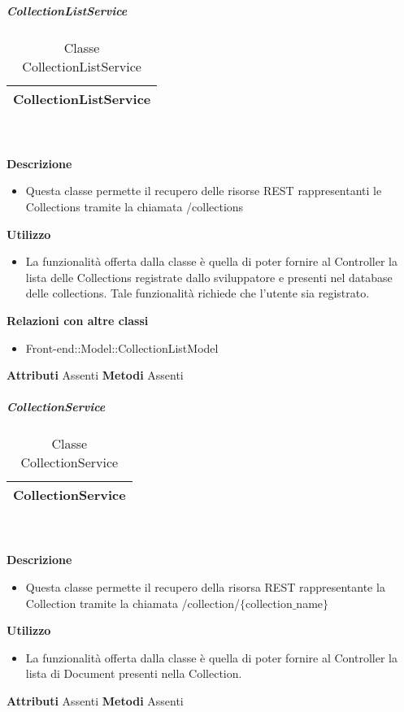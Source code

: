 			\subparagraph{CollectionListService} 
\begin{table}[ht]
\begin{center}
\bgroup
	\setlength{\arrayrulewidth}{0.6mm}
	\def\arraystretch{1}
		\begin{tabular}{ | p{12cm} | }
				\hline  
					\centerline{\textbf{CollectionListService}}
		\\ \hline 
				\hline
				\hline
		
		\end{tabular}
\egroup
\caption{Classe CollectionListService}
\end{center}
\end{table} \textbf{\\ \\ Descrizione}
\begin{itemize}
\item[] Questa classe permette il recupero delle risorse REST rappresentanti le Collections tramite la chiamata /collections
\end{itemize} 
\textbf{Utilizzo}
\begin{itemize}
\item[] La funzionalità offerta dalla classe è quella di poter fornire al Controller la lista delle Collections registrate dallo sviluppatore e presenti nel database delle collections.
Tale funzionalità richiede che l'utente sia registrato.
\end{itemize}
\textbf{Relazioni con altre classi}
\begin{itemize}
\item{Front-end::Model::CollectionListModel}
\end{itemize}
\textbf{Attributi}
Assenti
\textbf{Metodi}
Assenti

			\subparagraph{CollectionService} 
\begin{table}[ht]
\begin{center}
\bgroup
	\setlength{\arrayrulewidth}{0.6mm}
	\def\arraystretch{1}
		\begin{tabular}{ | p{12cm} | }
				\hline  
					\centerline{\textbf{CollectionService}}
		\\ \hline 
				\hline
				\hline
		
		\end{tabular}
\egroup
\caption{Classe CollectionService}
\end{center}
\end{table} \textbf{\\ \\ Descrizione}
\begin{itemize}
\item[] Questa classe permette il recupero della risorsa REST rappresentante la Collection tramite la chiamata  /collection/$\{$collection$\_$name$\}$
\end{itemize} 
\textbf{Utilizzo}
\begin{itemize}
\item[] La  funzionalità offerta dalla classe è quella di poter fornire al Controller la lista di Document presenti nella Collection.
\end{itemize}
\textbf{Attributi}
Assenti
\textbf{Metodi}
Assenti

